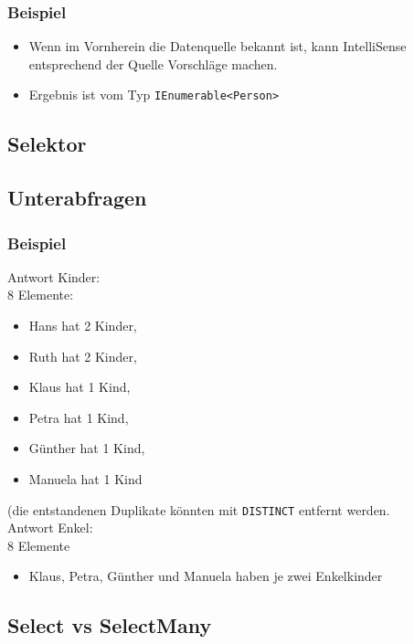 \subsubsection*{Beispiel}
\begin{itemize}
\item Wenn im Vornherein die Datenquelle bekannt ist, kann IntelliSense entsprechend der Quelle Vorschläge machen.
\item Ergebnis ist vom Typ \lstinline`IEnumerable<Person>`
\end{itemize}

\subsection{Selektor}

\subsection{Unterabfragen}

\subsubsection*{Beispiel}
Antwort Kinder:\\
8 Elemente:
\begin{itemize}
\item Hans hat 2 Kinder, 
\item Ruth hat 2 Kinder,
\item Klaus hat 1 Kind,
\item Petra hat 1 Kind,
\item Günther hat 1 Kind,
\item Manuela hat 1 Kind
\end{itemize}
(die entstandenen Duplikate könnten mit \lstinline`DISTINCT` entfernt werden.\bigskip\\
Antwort Enkel:\\
8 Elemente
\begin{itemize}
\item Klaus, Petra, Günther und Manuela haben je zwei Enkelkinder 
\end{itemize}

\subsection{Select vs SelectMany}

